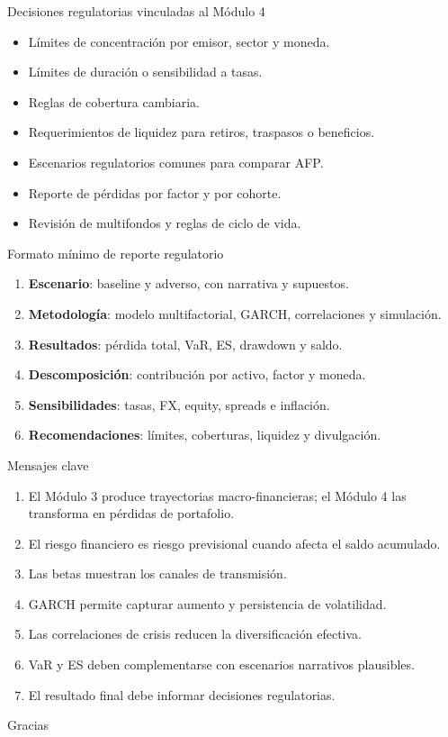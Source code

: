 \documentclass[aspectratio=169,11pt]{beamer}
\begin{document}
\begin{frame}{Decisiones regulatorias vinculadas al Módulo 4}
\begin{itemize}
  \item Límites de concentración por emisor, sector y moneda.
  \item Límites de duración o sensibilidad a tasas.
  \item Reglas de cobertura cambiaria.
  \item Requerimientos de liquidez para retiros, traspasos o beneficios.
  \item Escenarios regulatorios comunes para comparar AFP.
  \item Reporte de pérdidas por factor y por cohorte.
  \item Revisión de multifondos y reglas de ciclo de vida.
\end{itemize}
\end{frame}

\begin{frame}{Formato mínimo de reporte regulatorio}
\begin{enumerate}
  \item \textbf{Escenario}: baseline y adverso, con narrativa y supuestos.
  \item \textbf{Metodología}: modelo multifactorial, GARCH, correlaciones y simulación.
  \item \textbf{Resultados}: pérdida total, VaR, ES, drawdown y saldo.
  \item \textbf{Descomposición}: contribución por activo, factor y moneda.
  \item \textbf{Sensibilidades}: tasas, FX, equity, spreads e inflación.
  \item \textbf{Recomendaciones}: límites, coberturas, liquidez y divulgación.
\end{enumerate}
\end{frame}

\begin{frame}{Mensajes clave}
\begin{enumerate}
  \item El Módulo 3 produce trayectorias macro-financieras; el Módulo 4 las transforma en pérdidas de portafolio.
  \item El riesgo financiero es riesgo previsional cuando afecta el saldo acumulado.
  \item Las betas muestran los canales de transmisión.
  \item GARCH permite capturar aumento y persistencia de volatilidad.
  \item Las correlaciones de crisis reducen la diversificación efectiva.
  \item VaR y ES deben complementarse con escenarios narrativos plausibles.
  \item El resultado final debe informar decisiones regulatorias.
\end{enumerate}
\end{frame}



\begin{frame}
\centering
\Huge Gracias
\vspace{0.6cm}


\end{frame}
\end{document}
